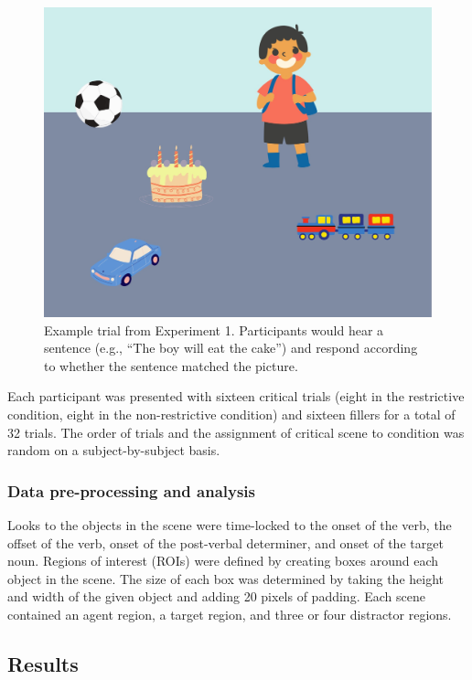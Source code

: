 \documentclass[
  man,floatsintext]{apa6}
\begin{document}
\begin{figure}
\centering
\includegraphics{group-a/E1-example-trial.jpeg}
\caption{\label{fig:E1-example-trial}Example trial from Experiment 1. Participants would hear a sentence (e.g., ``The boy will eat the cake'') and respond according to whether the sentence matched the picture.}
\end{figure}

Each participant was presented with sixteen critical trials (eight in
the restrictive condition, eight in the non-restrictive condition) and
sixteen fillers for a total of 32 trials. The order of trials and the
assignment of critical scene to condition was random on a
subject-by-subject basis.

\hypertarget{data-pre-processing-and-analysis}{%
\subsubsection{Data pre-processing and analysis}\label{data-pre-processing-and-analysis}}

Looks to the objects in the scene were time-locked to the onset of the
verb, the offset of the verb, onset of the post-verbal determiner, and
onset of the target noun. Regions of interest (ROIs) were defined by creating boxes around each object in the scene. The size of each box was determined by taking the height and width of the given object and adding 20 pixels of padding. Each scene contained an agent region, a target region, and three or four distractor regions.

\hypertarget{results}{%
\subsection{Results}\label{results}}
\end{document}
